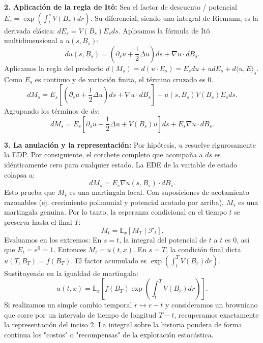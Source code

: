 \documentclass[11pt, letterpaper]{article}
\begin{document}
\begin{solucion}
    \textbf{2. Aplicación de la regla de Itô:}
    Sea el factor de descuento / potencial $E_s = \exp\left( \int_t^s V(B_r) dr \right)$. Su diferencial, siendo una integral de Riemann, es la derivada clásica: $dE_s = V(B_s) E_s ds$.
    Aplicamos la fórmula de Itô multidimensional a $u(s, B_s)$:
    \[ du(s, B_s) = \left( \partial_s u + \frac{1}{2}\Delta u \right) ds + \nabla u \cdot dB_s. \]
    Aplicamos la regla del producto $d(M_s) = d(u \cdot E_s) = E_s du + u dE_s + d\langle u, E \rangle_s$.
    Como $E_s$ es continuo y de variación finita, el término cruzado es 0.
    \[ dM_s = E_s \left[ \left( \partial_s u + \frac{1}{2}\Delta u \right) ds + \nabla u \cdot dB_s \right] + u(s, B_s) V(B_s) E_s ds. \]
    Agrupando los términos de $ds$:
    \[ dM_s = E_s \left[ \partial_s u + \frac{1}{2}\Delta u + V(B_s)u \right] ds + E_s \nabla u \cdot dB_s. \]

    \textbf{3. La anulación y la representación:}
    Por hipótesis, $u$ resuelve rigurosamente la EDP. Por consiguiente, el corchete completo que acompaña a $ds$ es idénticamente cero para cualquier estado.
    La EDE de la variable de estado colapsa a:
    \[ dM_s = E_s \nabla u(s, B_s) \cdot dB_s. \]
    Esto prueba que $M_s$ es una martingala local. Con suposiciones de acotamiento razonables (ej. crecimiento polinomial y potencial acotado por arriba), $M_s$ es una martingala genuina.
    Por lo tanto, la esperanza condicional en el tiempo $t$ se preserva hasta el final $T$:
    \[ M_t = \mathbb{E}_x[M_T \mid \mathcal{F}_t]. \]
    Evaluamos en los extremos:
    En $s=t$, la integral del potencial de $t$ a $t$ es 0, así que $E_t = e^0 = 1$. Entonces $M_t = u(t, x)$.
    En $s=T$, la condición final dicta $u(T, B_T) = f(B_T)$. El factor acumulado es $\exp(\int_t^T V(B_r) dr)$.
    Sustituyendo en la igualdad de martingala:
    \[ u(t, x) = \mathbb{E}_x\left[ f(B_T) \exp\left( \int_t^T V(B_r) dr \right) \right]. \]
    Si realizamos un simple cambio temporal $r \mapsto r - t$ y consideramos un browniano que corre por un intervalo de tiempo de longitud $T-t$, recuperamos exactamente la representación del inciso 2. La integral sobre la historia pondera de forma continua los "costos" o "recompensas" de la exploración estocástica.
\end{solucion}
\end{document}
